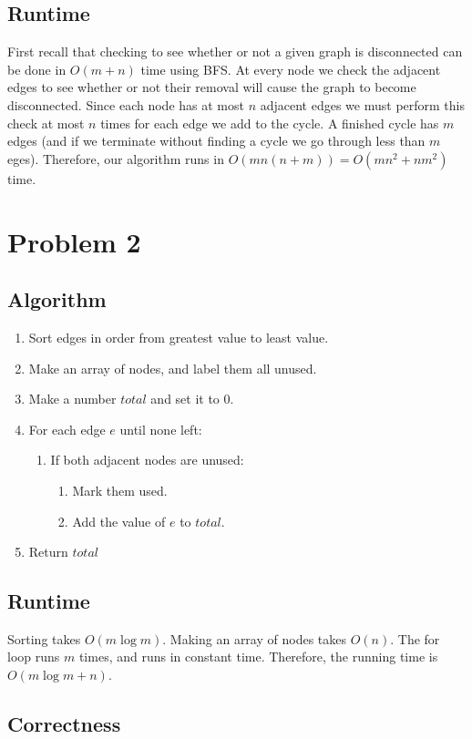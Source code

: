 \documentclass{article}
\begin{document}
\subsection{Runtime}
First recall that checking to see whether or not a given graph is disconnected can be done in $O(m+n)$ time using BFS. At every node we check the adjacent edges to see whether or not their removal will cause the graph to become disconnected. Since each node has at most $n$ adjacent edges we must perform this check at most $n$ times for each edge we add to the cycle. A finished cycle has $m$ edges (and if we terminate without finding a cycle we go through less than $m$ eges). Therefore, our algorithm runs in $O(mn(n+m))=O(mn^2+n m^2)$ time.

\section{Problem 2}
\subsection{Algorithm}
\begin{enumerate}
\item Sort edges in order from greatest value to least value.
\item Make an array of nodes, and label them all unused.
\item Make a number $total$ and set it to $0$.
\item For each edge $e$ until none left:
\begin{enumerate}
\item If both adjacent nodes are unused:
\begin{enumerate}
\item Mark them used.
\item Add the value of $e$ to $total$.
\end{enumerate}
\end{enumerate}
\item Return $total$
\end{enumerate}

\subsection{Runtime}
Sorting takes $O(m\log{m})$. Making an array of nodes takes $O(n)$. The for loop runs $m$ times, and runs in constant time. Therefore, the running time is $O(m\log{m}+n)$.

\subsection{Correctness}
\end{document}
